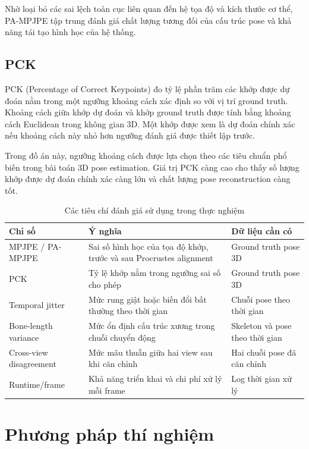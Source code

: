 \documentclass[../DoAn.tex]{subfiles}
\begin{document}
Nhờ loại bỏ các sai lệch toàn cục liên quan đến hệ tọa độ và kích thước cơ thể, PA-MPJPE tập trung đánh giá chất lượng tương đối của cấu trúc pose và khả năng tái tạo hình học của hệ thống.

\subsection{PCK}

PCK (Percentage of Correct Keypoints) đo tỷ lệ phần trăm các khớp được dự đoán nằm trong một ngưỡng khoảng cách xác định so với vị trí ground truth. Khoảng cách giữa khớp dự đoán và khớp ground truth được tính bằng khoảng cách Euclidean trong không gian 3D. Một khớp được xem là dự đoán chính xác nếu khoảng cách này nhỏ hơn ngưỡng đánh giá được thiết lập trước. 

Trong đồ án này, ngưỡng khoảng cách được lựa chọn theo các tiêu chuẩn phổ biến trong bài toán 3D pose estimation. Giá trị PCK càng cao cho thấy số lượng khớp được dự đoán chính xác càng lớn và chất lượng pose reconstruction càng tốt.

\begin{table}[H]
\centering
\caption{Các tiêu chí đánh giá sử dụng trong thực nghiệm}
\label{tab:evaluation_metrics_overview}
\begin{tabular}{|p{3.3cm}|p{4.6cm}|p{5.4cm}|}
\hline
\textbf{Chỉ số} & \textbf{Ý nghĩa} & \textbf{Dữ liệu cần có} \\
\hline
MPJPE / PA-MPJPE & Sai số hình học của tọa độ khớp, trước và sau Procrustes alignment & Ground truth pose 3D \\
\hline
PCK & Tỷ lệ khớp nằm trong ngưỡng sai số cho phép & Ground truth pose 3D \\
\hline
Temporal jitter & Mức rung giật hoặc biến đổi bất thường theo thời gian & Chuỗi pose theo thời gian \\
\hline
Bone-length variance & Mức ổn định cấu trúc xương trong chuỗi chuyển động & Skeleton và pose theo thời gian \\
\hline
Cross-view disagreement & Mức mâu thuẫn giữa hai view sau khi căn chỉnh & Hai chuỗi pose đã căn chỉnh \\
\hline
Runtime/frame & Khả năng triển khai và chi phí xử lý mỗi frame & Log thời gian xử lý \\
\hline
\end{tabular}
\end{table}

\section{Phương pháp thí nghiệm}
\end{document}
